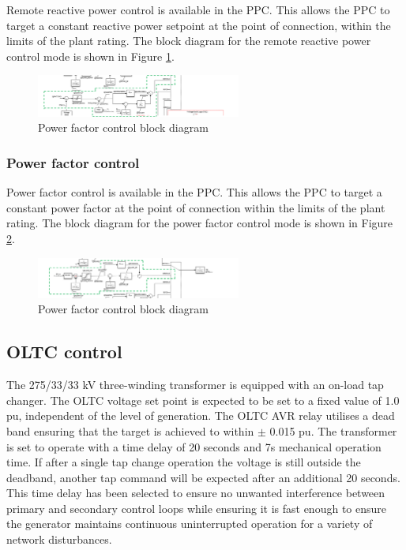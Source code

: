 \documentclass{../grid-link-report}
\begin{document}
	Remote reactive power control is available in the PPC. This allows the PPC to target a constant reactive power setpoint at the point of connection, within the limits of the plant rating. The block diagram for the remote reactive power control mode is shown in Figure \ref{fig:q-block-diagram}.
	
	\begin{figure}[H]
		\centering
		\includegraphics[width=0.6\textwidth]{report-assets/images/q-mode-block-diagram.png}
		\caption{Power factor control block diagram}
		\label{fig:q-block-diagram}
	\end{figure}
	
	
	\subsubsection{Power factor control}
	
	Power factor control is available in the PPC. This allows the PPC to target a constant power factor at the point of connection within the limits of the plant rating. The block diagram for the power factor control mode is shown in Figure \ref{fig:pf-block-diagram}.
	
	\begin{figure}[H]
		\centering
		\includegraphics[width=0.6\textwidth]{report-assets/images/pf-mode-block-diagram.png}
		\caption{Power factor control block diagram}
		\label{fig:pf-block-diagram}
	\end{figure}

	\subsection{OLTC control}
	
	The 275/33/33 kV three-winding transformer is equipped with an on-load tap changer. The OLTC voltage set point is expected to be set to a fixed value of 1.0 pu, independent of the level of generation. The OLTC \ac{AVR} relay utilises a dead band ensuring that the target is achieved to within $\pm$ 0.015 pu. The transformer is set to operate with a time delay of 20 seconds and 7s mechanical operation time. If after a single tap change operation the voltage is still outside the deadband, another tap command will be expected after an additional 20 seconds. This time delay has been selected to ensure no unwanted interference between primary and secondary control loops while ensuring it is fast enough to ensure the generator maintains continuous uninterrupted operation for a variety of network disturbances.
	
\end{document}
